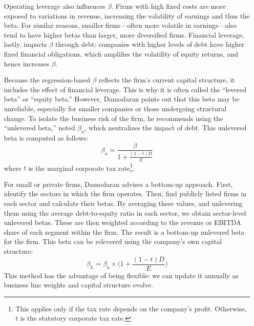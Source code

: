 Operating leverage also influences $\beta$. Firms with high fixed costs are more exposed to variations in revenue, increasing the volatility of earnings and thus the beta. For similar reasons, smaller firms—often more volatile in earnings—also tend to have higher betas than larger, more diversified firms. Financial leverage, lastly, impacts $\beta$ through debt: companies with higher levels of debt have higher fixed financial obligations, which amplifies the volatility of equity returns, and hence increases $\beta$.

Because the regression-based $\beta$ reflects the firm’s current capital structure, it includes the effect of financial leverage. This is why it is often called the “levered beta” or “equity beta.” However, Damodaran points out that this beta may be unreliable, especially for smaller companies or those undergoing structural change. To isolate the business risk of the firm, he recommends using the “unlevered beta,” noted $\beta_u$, which neutralizes the impact of debt. This unlevered beta is computed as follows:
\begin{equation}
   \beta_u = \frac{\beta}{1+\frac{(1-t)D}{E}} 
\end{equation}
where $t$ is the marginal corporate tax rate\footnote{This applies only if the tax rate depends on the company’s profit. Otherwise, $t$ is the statutory corporate tax rate.}.

For small or private firms, Damodaran advises a bottom-up approach. First, identify the sectors in which the firm operates. Then, find publicly listed firms in each sector and calculate their betas. By averaging these values, and unlevering them using the average debt-to-equity ratio in each sector, we obtain sector-level unlevered betas. These are then weighted according to the revenue or EBITDA share of each segment within the firm. The result is a bottom-up unlevered beta for the firm. This beta can be relevered using the company’s own capital structure:
\begin{equation}
    \beta_L =  \beta_u \times \bigg( 1 + \frac{(1-t)D}{E} \bigg)
\end{equation}
This method has the advantage of being flexible: we can update it annually as business line weights and capital structure evolve.

